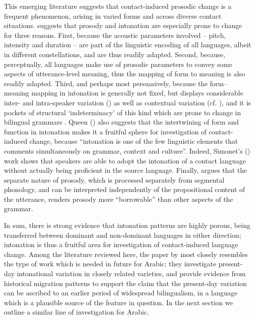 \documentclass[output=paper]{langsci/langscibook}
\begin{document}
This emerging literature suggests that contact-induced prosodic change is a frequent phenomenon, arising in varied forms and across diverse contact situations. \citet{Bullock2009} suggests that prosody and intonation are especially prone to change for three reasons. First, because the acoustic parameters involved -- pitch, intensity and duration -- are part of the linguistic encoding of all languages, albeit in different constellations, and are thus readily adapted. Second, because, perceptually, all languages make use of prosodic parameters to convey some aspects of utterance-level meaning, thus the mapping of form to meaning is also readily adapted. Third, and perhaps most persuasively, because the form--meaning mapping in intonation is generally not fixed, but displays considerable inter- and intra-speaker variation (\citealt{CangemiGriceKrüger2015,CangemiEtAl2016}) as well as contextual variation (cf. \citealt{Walker2014}), and it is pockets of structural ‘indeterminacy’ of this kind which are prone to change in bilingual grammars \citep{Sorace2004}. Queen (\citeyear[57]{Queen2001}) also suggests that the intertwining of form and function in intonation makes it a fruitful sphere for investigation of contact-induced change, because “intonation is one of the few linguistic elements that comments simultaneously on grammar, context and culture”. Indeed, Simonet's (\citeyear{Simonet2011}) work shows that speakers are able to adopt the intonation of a contact language without actually being proficient in the source language. Finally, \citet{Matras2007borrowability} argues that the separate nature of prosody, which is processed separately from segmental phonology, and can be interpreted independently of the propositional content of the utterance, renders prosody more ``borrowable'' than other aspects of the grammar. 

In sum, there is strong evidence that intonation patterns are highly porous, being transferred between dominant and non-dominant languages in either direction; intonation is thus a fruitful area for investigation of contact-induced language change. Among the literature reviewed here, the paper by \citet{ColantoniGurlekian2004} most closely resembles the type of work which is needed in future for Arabic; they investigate present-day intonational variation in closely related varieties, and provide evidence from historical migration patterns to support the claim that the present-day variation can be ascribed to an earlier period of widespread bilingualism, in a language which is a plausible source of the feature in question. In the next section we outline a similar line of investigation for Arabic.
\end{document}
